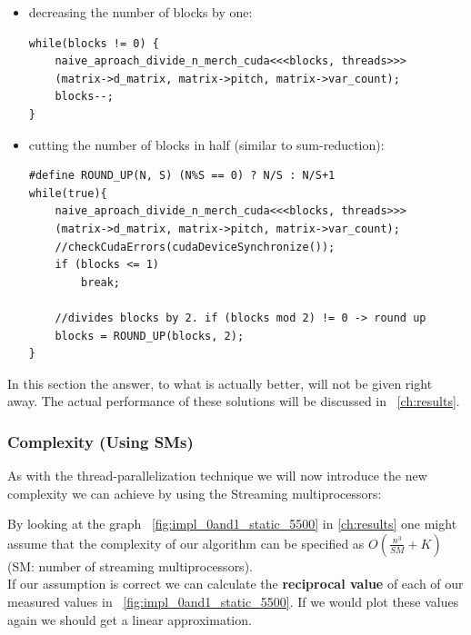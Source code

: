 \documentclass[draft, final]{vutinfth} %
\begin{document}
			\begin{itemize}
				\item decreasing the number of blocks by one:
					\begin{lstlisting}
while(blocks != 0) {
	naive_aproach_divide_n_merch_cuda<<<blocks, threads>>>
	(matrix->d_matrix, matrix->pitch, matrix->var_count);
	blocks--;
}
					\end{lstlisting}
				\item cutting the number of blocks in half (similar to sum-reduction):
					\begin{lstlisting}
#define ROUND_UP(N, S) (N%S == 0) ? N/S : N/S+1
while(true){
	naive_aproach_divide_n_merch_cuda<<<blocks, threads>>>
	(matrix->d_matrix, matrix->pitch, matrix->var_count);
	//checkCudaErrors(cudaDeviceSynchronize());
	if (blocks <= 1)
		break;

	//divides blocks by 2. if (blocks mod 2) != 0 -> round up
	blocks = ROUND_UP(blocks, 2);
}
					\end{lstlisting}
			\end{itemize}
			In this section the answer, to what is actually better, will not be given right away. The actual performance of these solutions will be discussed in ~\ref{ch:results}.

			\subsubsection{Complexity (Using SMs)}
				As with the thread-parallelization technique we will now introduce the new complexity we can achieve by using the Streaming multiprocessors:

				By looking at the graph ~\ref{fig:impl_0and1_static_5500} in \ref{ch:results} one might assume that the complexity of our algorithm can be specified as $O(\frac{n^3}{SM} + K)$ (SM: number of streaming multiprocessors).\\
				If our assumption is correct we can calculate the \textbf{reciprocal value} of each of our measured values in ~\ref{fig:impl_0and1_static_5500}. If we would plot these values again we should get a linear approximation.
\end{document}
